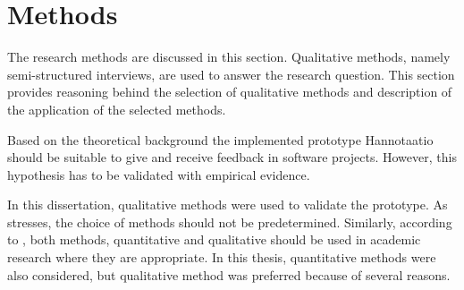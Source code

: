 \documentclass[english,12pt,a4paper,pdftex]{article}
\begin{document}
\clearpage

\section{Methods}
\label{sec:methods}
\acresetall

The research methods are discussed in this section. Qualitative methods, namely semi-structured interviews, are used to answer the research question. This section provides reasoning behind the selection of qualitative methods and description of the application of the selected methods.

Based on the theoretical background the implemented prototype Hannotaatio should be suitable to give and receive feedback in software projects. However, this hypothesis has to be validated with empirical evidence. 

In this dissertation, qualitative methods were used to validate the prototype. As \citet{silverman2009} stresses, the choice of methods should not be predetermined. Similarly, according to \citet{gummesson1999}, both methods, quantitative and qualitative should be used in academic research where they are appropriate. In this thesis, quantitative methods were also considered, but qualitative method was preferred because of several reasons. 
\end{document}
